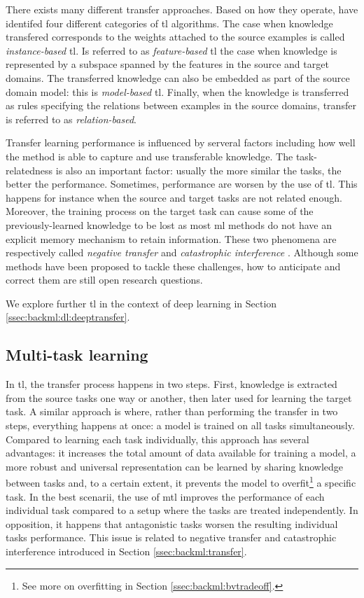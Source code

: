 There exists many different transfer approaches. Based on how they operate,
\parencite{yang2020transfer} have identifed four different categories of \acrlong{tl}
algorithms. The case when knowledge transfered corresponds to the weights attached
to the source examples is called \textit{instance-based} \acrlong{tl}. Is referred
to as \textit{feature-based} \acrlong{tl} the case when knowledge is represented
by a subspace spanned by the features in the source and target domains. The
transferred knowledge can also be embedded as part of the source domain model:
this is \textit{model-based} \acrlong{tl}. Finally, when the knowledge is
transferred as rules specifying the relations between examples in the source
domains, transfer is referred to as \textit{relation-based}.

Transfer learning performance is influenced by serveral factors including how well
the method is able to capture and use transferable knowledge. The task-relatedness
is also an important factor: usually the more similar the tasks, the better the
performance. Sometimes, performance are worsen by the use of \acrlong{tl}. This
happens for instance when the source and target tasks are not related enough.
Moreover, the training process on the target task can cause some of the
previously-learned knowledge to be lost as most \acrlong{ml} methods do not have
an explicit memory mechanism to retain information. These two phenomena are
respectively called \textit{negative transfer} \parencite{zhang2020overcoming}
and \textit{catastrophic interference} \parencite{french1999catastrophic}. Although
some methods have been proposed to tackle these challenges, how to anticipate and
correct them are still open research questions.

We explore further \acrlong{tl} in the context of deep learning in Section
\ref{ssec:backml:dl:deeptransfer}.

\subsection{Multi-task learning}
\label{ssec:backml:mtl}

In \acrlong{tl}, the transfer process happens in two steps. First, knowledge is
extracted from the source tasks one way or another, then later used for learning
the target task. A similar approach is  where, rather than performing
the transfer in two steps, everything happens at once: a model is trained on all
tasks simultaneously. Compared to learning each task individually, this approach
has several advantages: it increases the total amount of data available for training
a model, a more robust and universal representation can be learned by sharing
knowledge between tasks and, to a certain extent, it prevents the model to
overfit\footnote{See more on overfitting in Section \ref{ssec:backml:bvtradeoff}.}
a specific task. In the best scenarii, the use of \acrlong{mtl} improves the
performance of each individual task compared to a setup where the tasks are treated
independently. In opposition, it happens that antagonistic tasks worsen the resulting
individual tasks performance. This issue is related to negative transfer
and catastrophic interference introduced in Section \ref{ssec:backml:transfer}.

